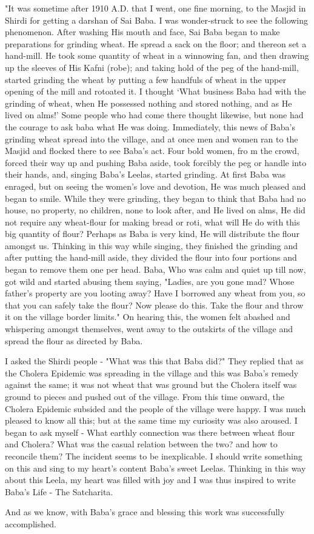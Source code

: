 "It was sometime after 1910 A.D. that I went, one fine morning, to the Masjid in Shirdi for getting a darshan of Sai Baba. I was wonder-struck to see the following phenomenon. After washing His mouth and face, Sai Baba began to make preparations for grinding wheat. He spread a sack on the floor; and thereon set a hand-mill. He took some quantity of wheat in a winnowing fan, and then drawing up the sleeves of His Kafni (robe); and taking hold of the peg of the hand-mill, started grinding the wheat by putting a few handfuls of wheat in the upper opening of the mill and rotoated it. I thought ‘What business Baba had with the grinding of wheat, when He possessed nothing and stored nothing, and as He lived on alms!’ Some people who had come there thought likewise, but none had the courage to ask baba what He was doing. Immediately, this news of Baba's grinding wheat spread into the village, and at once men and women ran to the Masjid and flocked there to see Baba's act. Four bold women, fro m the crowd, forced their way up and pushing Baba aside, took forcibly the peg or handle into their hands, and, singing Baba's Leelas, started grinding. At first Baba was enraged, but on seeing the women's love and devotion, He was much pleased and began to smile. While they were grinding, they began to think that Baba had no house, no property, no children, none to look after, and He lived on alms, He did not require any wheat-flour for making bread or roti, what will He do with this big quantity of flour? Perhaps as Baba is very kind, He will distribute the flour amongst us. Thinking in this way while singing, they finished the grinding and after putting the hand-mill aside, they divided the flour into four portions and began to remove them one per head. Baba, Who was calm and quiet up till now, got wild and started abusing them saying, "Ladies, are you gone mad? Whose father's property are you looting away? Have I borrowed any wheat from you, so that you can safely take the flour? Now please do this. Take the flour and throw it on the village border limits." On hearing this, the women felt abashed and whispering amongst themselves, went away to the outskirts of the village and spread the flour as directed by Baba.

I asked the Shirdi people - "What was this that Baba did?" They replied that as the Cholera Epidemic was spreading in the village and this was Baba's remedy against the same; it was not wheat that was ground but the Cholera itself was ground to pieces and pushed out of the village. From this time onward, the Cholera Epidemic subsided and the people of the village were happy. I was much pleased to know all this; but at the same time my curiosity was also aroused. I began to ask myself - What earthly connection was there between wheat flour and Cholera? What was the casual relation between the two? and how to reconcile them? The incident seems to be inexplicable. I should write something on this and sing to my heart's content Baba's sweet Leelas. Thinking in this way about this Leela, my heart was filled with joy and I was thus inspired to write Baba's Life - The Satcharita.

And as we know, with Baba's grace and blessing this work was successfully accomplished.

